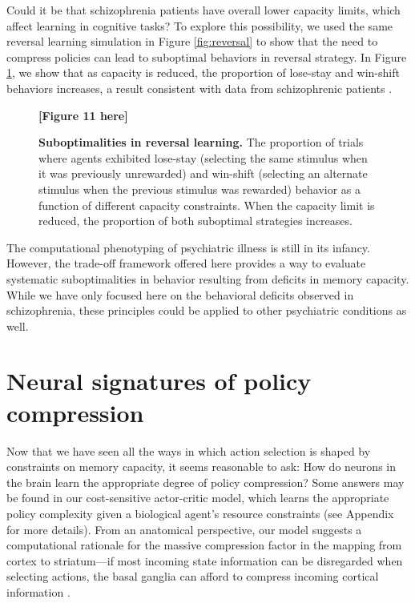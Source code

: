 \documentclass[11pt]{article}
\begin{document}
Could it be that schizophrenia patients have overall lower capacity limits, which affect learning in cognitive tasks? To explore this possibility, we used the same reversal learning simulation in Figure \ref{fig:reversal} to show that the need to compress policies can lead to suboptimal behaviors in reversal strategy. In Figure \ref{fig:revsz}, we show that as capacity is reduced, the proportion of lose-stay and win-shift behaviors increases, a result consistent with data from schizophrenic patients \citep{Reddy2016-ew}.

\begin{figure}
    \centering
    \textbf{[Figure 11 here]}
            \caption{\textbf{Suboptimalities in reversal learning.} The proportion of trials where agents exhibited lose-stay (selecting the same stimulus when it was previously unrewarded) and win-shift (selecting an alternate stimulus when the previous stimulus was rewarded) behavior as a function of different capacity constraints. When the capacity limit is reduced, the proportion of both suboptimal strategies increases.}
    \label{fig:revsz}
\end{figure}

The computational phenotyping of psychiatric illness is still in its infancy. However, the trade-off framework offered here provides a way to evaluate systematic suboptimalities in behavior resulting from deficits in memory capacity. While we have only focused here on the behavioral deficits observed in schizophrenia, these principles could be applied to other psychiatric conditions as well.


\section{Neural signatures of policy compression}

Now that we have seen all the ways in which action selection is shaped by constraints on memory capacity, it seems reasonable to ask: How do neurons in the brain learn the appropriate degree of policy compression? Some answers may be found in our cost-sensitive actor-critic model, which learns the appropriate policy complexity given a biological agent's resource constraints (see Appendix for more details). From an anatomical perspective, our model suggests a computational rationale for the massive compression factor in the mapping from cortex to striatum---if most incoming state information can be disregarded when selecting actions, the basal ganglia can afford to compress incoming cortical information \citep{Bar-Gad2003-fn}. 
\end{document}
